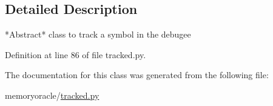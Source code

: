 \subsection{Detailed Description}
\begin{DoxyVerb}*Abstract* class to track a symbol in the debugee
\end{DoxyVerb}
 

Definition at line 86 of file tracked.\+py.



The documentation for this class was generated from the following file\+:\begin{DoxyCompactItemize}
\item 
memoryoracle/\hyperlink{tracked_8py}{tracked.\+py}\end{DoxyCompactItemize}
